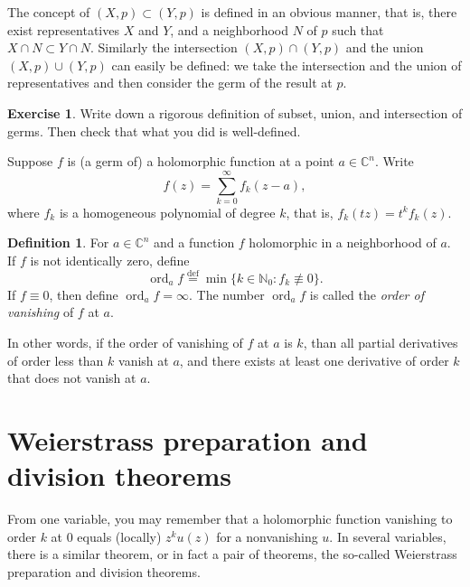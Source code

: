 \documentclass[12pt,openany]{book}
\newcommand{\ord}{\operatorname{ord}}
\newcommand{\C}{{\mathbb{C}}}
\newcommand{\N}{{\mathbb{N}}}
\newcommand{\myindex}[1]{#1\index{#1}}
\newcommand{\sectionnewpage}{}
\theoremstyle{plain}
\theoremstyle{remark}
\theoremstyle{definition}
\newtheorem{defn}[thm]{Definition}
\newenvironment{exbox}{%
    \def\FrameCommand{\vrule width 1pt \relax\hspace {10pt}}%
    \MakeFramed {\advance \hsize -\width \FrameRestore }%
}{%
    \endMakeFramed
}
\theoremstyle{exercise}
\newtheorem{exercise}{Exercise}[section]
\theoremstyle{example}
\begin{document}
The concept of $(X,p) \subset (Y,p)$ is defined in an obvious manner,
that is, there exist representatives $X$ and $Y$, and a neighborhood $N$
of $p$ such that $X \cap N \subset Y \cap N$.
Similarly the intersection $(X,p) \cap (Y,p)$ and
the union $(X,p) \cup (Y,p)$ can easily be defined: we take the intersection
and the union of representatives and then consider the germ of the result at $p$.

\begin{exbox}
\begin{exercise}
Write down a rigorous definition of subset, union, and intersection of germs.
Then check that what you did is well-defined.
\end{exercise}
\end{exbox}

Suppose
$f$ is (a germ of) a holomorphic function at a point $a \in \C^n$.
Write
\begin{equation*}
f(z) = \sum_{k=0}^\infty f_k(z-a),
\end{equation*}
where $f_k$ is a homogeneous polynomial of degree $k$,
that is, $f_k(tz) = t^k f_k(z)$.

\begin{defn}
For $a \in \C^n$ and a function $f$ holomorphic in a neighborhood of $a$.
If $f$ is not identically zero,
define
\begin{equation*}
\ord_a f \overset{\text{def}}{=} \min \{ k \in \N_0 : f_k \not\equiv 0 \} .
\end{equation*}
If $f \equiv 0$, then define $\ord_a f = \infty$.
The number $\ord_a f$ is called the \emph{\myindex{order of vanishing}} of $f$ at $a$.
\end{defn}

In other words, if the order of vanishing of $f$ at $a$ is $k$, than all
partial derivatives of order less than $k$ vanish at $a$, and there exists
at least one derivative of order $k$ that does not vanish at $a$.


\sectionnewpage
\section{Weierstrass preparation and division theorems} \label{sec:wpt}

From one variable, you may remember that a holomorphic function 
vanishing to order $k$ at 0 equals (locally) $z^k u(z)$ for a nonvanishing $u$.
In several variables, there is a similar theorem, or in fact a pair of theorems,
the so-called Weierstrass preparation and
division theorems.
\end{document}
